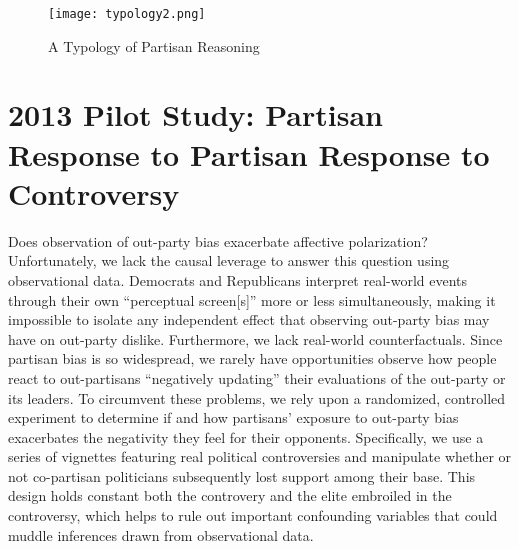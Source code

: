 \documentclass[12pt, letterpaper]{article}
\begin{document}
\begin{figure}
\caption{A Typology of Partisan Reasoning} \label{fig:typology}
\begin{center}
\texttt{[image: typology2.png]}
\end{center}
\end{figure}

\section*{2013 Pilot Study: Partisan Response to Partisan Response to Controversy}

Does observation of out-party bias exacerbate affective polarization? Unfortunately, we lack the causal leverage to answer this question using observational data. Democrats and Republicans interpret real-world events through their own ``perceptual screen[s]'' \citep{campbell1960} more or less simultaneously, making it impossible to isolate any independent effect that observing out-party bias may have on out-party dislike. Furthermore, we lack real-world counterfactuals. Since partisan bias is so widespread, we rarely have opportunities observe how people react to out-partisans ``negatively updating'' their evaluations of the out-party or its leaders. To circumvent these problems, we rely upon a randomized, controlled experiment to determine if and how partisans' exposure to out-party bias exacerbates the negativity they feel for their opponents. Specifically, we use a series of vignettes featuring real political controversies and manipulate whether or not co-partisan politicians subsequently lost support among their base. This design holds constant both the controvery and the elite embroiled in the controversy, which helps to rule out important confounding variables that could muddle inferences drawn from observational data. 
\end{document}
